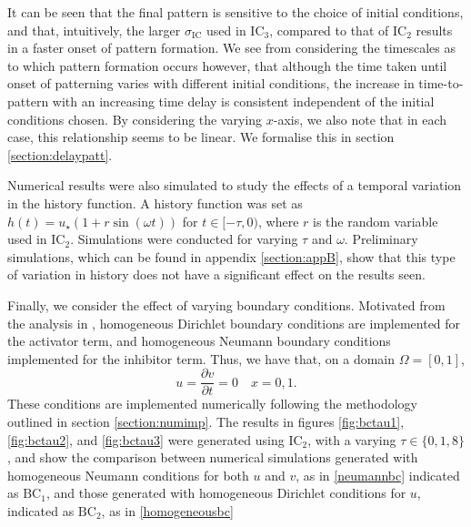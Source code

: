 It can be seen that the final pattern is sensitive to the choice of initial conditions, and that, intuitively, the larger $\sigma_{\text{IC}}$ used in $\text{IC}_3$, compared to that of $\text{IC}_2$ results in a faster onset of pattern formation. We see from considering the timescales as to which pattern formation occurs however, that although the time taken until onset of patterning varies with different initial conditions, the increase in time-to-pattern with an increasing time delay is consistent independent of the initial conditions chosen. By considering the varying $x$-axis, we also note that in each case, this relationship seems to be linear. We formalise this in section \ref{section:delaypatt}.

Numerical results were also simulated to study the effects of a temporal variation in the history function. A history function was set as $h(t)=u_\star(1+r\sin(\omega t))$ for $t\in[-\tau,0)$, where $r$ is the random variable used in $\text{IC}_2$. Simulations were conducted for varying $\tau$ and $\omega$. Preliminary simulations, which can be found in appendix \ref{section:appB}, show that this type of variation in history does not have a significant effect on the results seen.

Finally, we consider the effect of varying boundary conditions. Motivated from the analysis in \cite{krausemixed}, homogeneous Dirichlet boundary conditions are implemented for the activator term, and homogeneous Neumann boundary conditions implemented for the inhibitor term. Thus, we have that, on a domain $\Omega=[0,1]$,
\begin{equation}\label{homogeneousbc}
u=\frac{\partial v}{\partial t}=0 \quad x=0, 1.
\end{equation}
These conditions are implemented numerically following the methodology outlined in section \ref{section:numimp}. The results in figures \ref{fig:bctau1}, \ref{fig:bctau2}, and \ref{fig:bctau3} were generated using $\text{IC}_2$, with a varying $\tau\in\{0,1,8\}$, and show the comparison between numerical simulations generated with homogeneous Neumann conditions for both $u$ and $v$, as in \eqref{neumannbc} indicated as $\text{BC}_1$, and those generated with homogeneous Dirichlet conditions for $u$, indicated as $\text{BC}_2$, as in \eqref{homogeneousbc}


